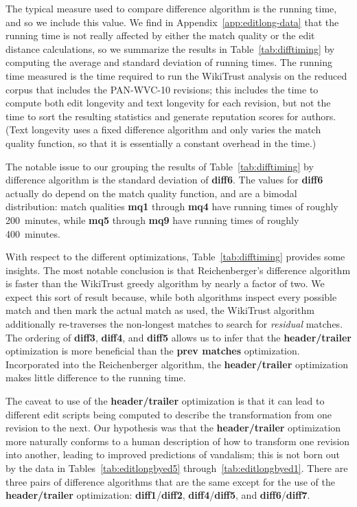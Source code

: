 The typical measure used to compare difference algorithm is the
running time, and so we include this value.
We find in Appendix~\ref{app:editlong-data} that the running time
is not really affected by either the
match quality or the edit distance calculations, so we
summarize the results in Table~\ref{tab:difftiming} by
computing the average and standard deviation of running times.
The running time measured is the time required to run the
WikiTrust analysis on the reduced corpus that includes
the PAN-WVC-10 revisions; this includes the time to compute
both edit longevity and text longevity for each revision,
but not the time to sort the resulting statistics and generate
reputation scores for authors.
(Text longevity uses a fixed difference algorithm and only varies
the match quality function, so that it is essentially a constant
overhead in the time.)

The notable issue to our grouping the results of
Table~\ref{tab:difftiming} by difference algorithm
is the standard deviation of \textbf{diff6}.
The values for \textbf{diff6} actually do depend on the
match quality function, and are a bimodal distribution:
match qualities \textbf{mq1} through \textbf{mq4} have
running times of roughly 200~minutes, while
\textbf{mq5} through \textbf{mq9} have running times
of roughly 400~minutes.



With respect to the different optimizations, Table~\ref{tab:difftiming}
provides some insights.
The most notable conclusion is that Reichenberger's
difference algorithm is faster than the WikiTrust
greedy algorithm by nearly a factor of two.
We expect this sort of result because, while both algorithms
inspect every possible match and then mark the actual
match as used, the WikiTrust algorithm additionally
re-traverses the non-longest matches to search for
\textit{residual} matches.
The ordering of \textbf{diff3}, \textbf{diff4}, and \textbf{diff5}
allows us to infer that the \textbf{header/trailer} optimization
is more beneficial than the \textbf{prev matches} optimization.
Incorporated into the Reichenberger algorithm, the
\textbf{header/trailer} optimization makes little difference
to the running time.

The caveat to use of the \textbf{header/trailer} optimization
is that it can lead to different edit scripts being computed
to describe the transformation from one revision to the next.
Our hypothesis was that the \textbf{header/trailer} optimization
more naturally conforms to a human description of how to transform
one revision into another, leading to improved predictions of
vandalism; this is not born out by the data in
Tables~\ref{tab:editlongbyed5} through~\ref{tab:editlongbyed1}.
There are three pairs of difference algorithms that are the same
except for the use of the \textbf{header/trailer} optimization:
\textbf{diff1}/\textbf{diff2}, \textbf{diff4}/\textbf{diff5},
and \textbf{diff6}/\textbf{diff7}.

